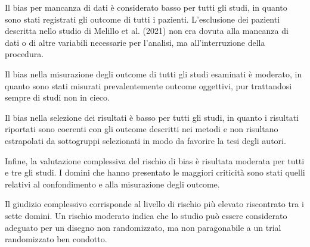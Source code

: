\documentclass[12pt,a4paper,twoside]{article}
\begin{document}
Il bias per mancanza di dati è considerato basso per tutti gli studi, in quanto sono stati registrati gli outcome di tutti i pazienti. L'esclusione dei pazienti descritta nello studio di Melillo et al. (2021) non era dovuta alla mancanza di dati o di altre variabili necessarie per l'analisi, ma all'interruzione della procedura.

Il bias nella misurazione degli outcome di tutti gli studi esaminati è moderato, in quanto sono stati misurati prevalentemente outcome oggettivi, pur trattandosi sempre di studi non in cieco.

Il bias nella selezione dei risultati è basso per tutti gli studi, in quanto i risultati riportati sono coerenti con gli outcome descritti nei metodi e non risultano estrapolati da sottogruppi selezionati in modo da favorire la tesi degli autori.

Infine, la valutazione complessiva del rischio di bias è risultata moderata per tutti e tre gli studi. I domini che hanno presentato le maggiori criticità sono stati quelli relativi al confondimento e alla misurazione degli outcome.

Il giudizio complessivo corrisponde al livello di rischio più elevato riscontrato tra i sette domini. Un rischio moderato indica che lo studio può essere considerato adeguato per un disegno non randomizzato, ma non paragonabile a un trial randomizzato ben condotto.
\end{document}
